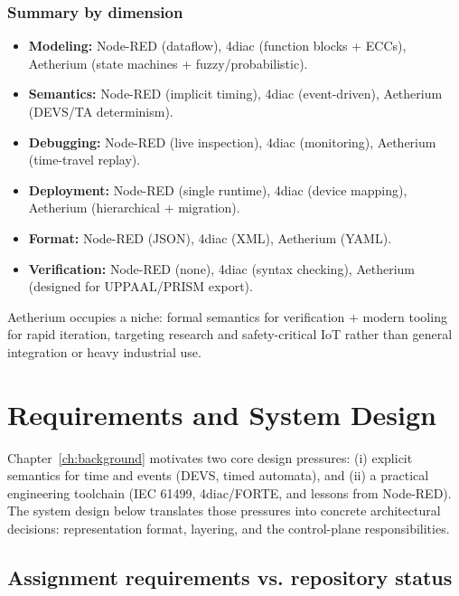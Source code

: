 \subsection{Summary by dimension}

\begin{itemize}
  \item \textbf{Modeling:} Node-RED (dataflow), 4diac (function blocks + ECCs), Aetherium (state machines + fuzzy/probabilistic).
  \item \textbf{Semantics:} Node-RED (implicit timing), 4diac (event-driven), Aetherium (DEVS/TA determinism).
  \item \textbf{Debugging:} Node-RED (live inspection), 4diac (monitoring), Aetherium (time-travel replay).
  \item \textbf{Deployment:} Node-RED (single runtime), 4diac (device mapping), Aetherium (hierarchical + migration).
  \item \textbf{Format:} Node-RED (JSON), 4diac (XML), Aetherium (YAML).
  \item \textbf{Verification:} Node-RED (none), 4diac (syntax checking), Aetherium (designed for UPPAAL/PRISM export).
\end{itemize}


Aetherium occupies a niche: formal semantics for verification + modern tooling for rapid iteration, targeting research and safety-critical IoT rather than general integration or heavy industrial use.

\chapter{Requirements and System Design}
\label{ch:design}

Chapter~\ref{ch:background} motivates two core design pressures: (i) explicit semantics for time and events (DEVS, timed automata), and (ii) a practical engineering toolchain (IEC 61499, 4diac/FORTE, and lessons from Node-RED).
The system design below translates those pressures into concrete architectural decisions: representation format, layering, and the control-plane responsibilities.

\section{Assignment requirements vs. repository status}

